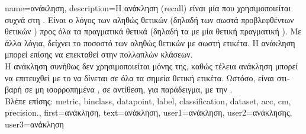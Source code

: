 {name={\foreignlanguage{greek}{ανάκληση}}, 
	description={\foreignlanguage{greek}{Η ανάκληση} (recall) 
		\foreignlanguage{greek}{είναι μία}  \foreignlanguage{greek}{που χρησιμοποιείται συχνά στη} 
		. \foreignlanguage{greek}{Είναι ο λόγος των αληθώς θετικών (δηλαδή των σωστά 
		προβλεφθέντων θετικών} ) \foreignlanguage{greek}{προς όλα τα πραγματικά 
		θετικά (δηλαδή τα}  \foreignlanguage{greek}{με μία θετική πραγματική} 
		). \foreignlanguage{greek}{Με άλλα λόγια, δείχνει το ποσοστό των αληθώς θετικών με 
		σωστή ετικέτα. Η ανάκληση μπορεί επίσης να επεκταθεί στην} 
		\foreignlanguage{greek}{πολλαπλών κλάσεων}. \\
		\foreignlanguage{greek}{Η ανάκληση συνήθως δεν χρησιμοποιείται μόνης της, καθώς τέλεια ανάκληση 
		μπορεί να επιτευχθεί με το να δίνεται σε όλα τα σημεία θετική ετικέτα. %
		Ωστόσο, είναι στιβαρή σε μη ισορροπημένα} , \foreignlanguage{greek}{σε αντίθεση, 
		για παράδειγμα, με την} . 
		\\ 
		\foreignlanguage{greek}{Βλέπε επίσης:} \gls{metric}, \gls{binclass}, \gls{datapoint}, \gls{label}, \gls{classification}, 
		\gls{dataset}, \gls{acc}, \gls{cm}, \gls{precision}.},
	first={\foreignlanguage{greek}{ανάκληση}}, 
	text={\foreignlanguage{greek}{ανάκληση}},
	user1={\foreignlanguage{greek}{ανάκληση}}, %
	user2={\foreignlanguage{greek}{ανάκλησης}}, %
	user3={\foreignlanguage{greek}{ανάκληση}} %
}


